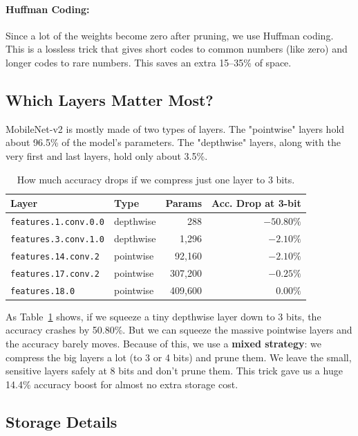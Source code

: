 \documentclass[11pt,a4paper]{article}
\begin{document}
\paragraph{Huffman Coding:} Since a lot of the weights become zero after pruning, we use Huffman coding. This is a lossless trick that gives short codes to common numbers (like zero) and longer codes to rare numbers. This saves an extra 15--35\% of space.

\subsection{Which Layers Matter Most?}

MobileNet-v2 is mostly made of two types of layers. The "pointwise" layers hold about 96.5\% of the model's parameters. The "depthwise" layers, along with the very first and last layers, hold only about 3.5\%.

\begin{table}[ht]
\centering
\begin{tabular}{@{}llrr@{}}
\toprule
\textbf{Layer} & \textbf{Type} & \textbf{Params} & \textbf{Acc. Drop at 3-bit} \\
\midrule
\texttt{features.1.conv.0.0} & depthwise & 288 & $-50.80\%$ \\
\texttt{features.3.conv.1.0} & depthwise & 1{,}296 & $-2.10\%$ \\
\texttt{features.14.conv.2} & pointwise & 92{,}160 & $-2.10\%$ \\
\texttt{features.17.conv.2} & pointwise & 307{,}200 & $-0.25\%$ \\
\texttt{features.18.0} & pointwise & 409{,}600 & $0.00\%$ \\
\bottomrule
\end{tabular}
\caption{How much accuracy drops if we compress just one layer to 3 bits.}
\label{tab:sensitivity}
\end{table}

As Table~\ref{tab:sensitivity} shows, if we squeeze a tiny depthwise layer down to 3 bits, the accuracy crashes by 50.80\%. But we can squeeze the massive pointwise layers and the accuracy barely moves. Because of this, we use a \textbf{mixed strategy}: we compress the big layers a lot (to 3 or 4 bits) and prune them. We leave the small, sensitive layers safely at 8 bits and don't prune them. This trick gave us a huge 14.4\% accuracy boost for almost no extra storage cost.

\subsection{Storage Details}
\end{document}
